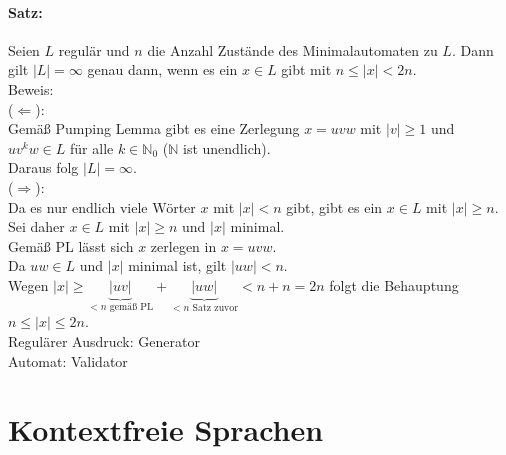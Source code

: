 \documentclass{scrreprt}
\begin{document}
\paragraph{Satz:} Seien $L$ regulär und $n$ die Anzahl Zustände des Minimalautomaten zu $L$. Dann gilt $|L| = \infty$ genau dann, wenn es ein $x \in L$ gibt mit $n\leq  |x| < 2n$.\\
Beweis:\\
($\Leftarrow$):\\
Gemäß Pumping Lemma gibt es eine Zerlegung $x=uvw$ mit $|v| \geq 1$ und $uv^kw\in L$ für alle $k \in \mathbb{N}_0$ ($\mathbb{N}$ ist unendlich).\\
Daraus folg $|L|=\infty$.\\
($\Rightarrow$):\\
Da es nur endlich viele Wörter $x$ mit $|x|<n$ gibt, gibt es ein $x\in L$ mit $|x|\geq n$.\\
Sei daher $x\in L$ mit $|x| \geq n$ und $|x|$ minimal.\\
Gemäß PL lässt sich $x$ zerlegen in $x=uvw$.\\
Da $uw \in L$ und $|x|$ minimal ist, gilt $|uw|<n$.\\
Wegen $|x|\geq \underbrace{|uv|}_{<n \text{ gemäß PL}}+\underbrace{|uw|}_{<n \text{ Satz zuvor}}<n+n=2n$ folgt die Behauptung $n \leq |x| \leq 2n$. \\
Regulärer Ausdruck: Generator\\
Automat: Validator
\section{Kontextfreie Sprachen}
\end{document}
